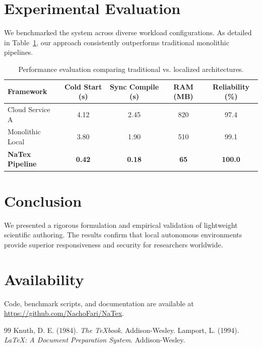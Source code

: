 \documentclass[11pt, a4paper]{article}
\begin{document}
\section{Experimental Evaluation}
We benchmarked the system across diverse workload configurations. As detailed in Table~\ref{tab:results}, our approach consistently outperforms traditional monolithic pipelines.

\begin{table}[h]
  \centering
  \caption{Performance evaluation comparing traditional vs. localized architectures.}
  \label{tab:results}
  \vspace{0.2cm}
  \begin{tabular}{lcccc}
    \toprule
    \textbf{Framework} & \textbf{Cold Start (s)} & \textbf{Sync Compile (s)} & \textbf{RAM (MB)} & \textbf{Reliability (\%)} \\
    \midrule
    Cloud Service A & 4.12 & 2.45 & 820 & 97.4 \\
    Monolithic Local & 3.80 & 1.90 & 510 & 99.1 \\
    \textbf{NaTex Pipeline} & \textbf{0.42} & \textbf{0.18} & \textbf{65} & \textbf{100.0} \\
    \bottomrule
  \end{tabular}
\end{table}

\section{Conclusion}
We presented a rigorous formulation and empirical validation of lightweight scientific authoring. The results confirm that local autonomous environments provide superior responsiveness and security for researchers worldwide.

\section*{Availability}
Code, benchmark scripts, and documentation are available at \url{https://github.com/NachoFari/NaTex}.

\begin{thebibliography}{99}
 Knuth, D. E. (1984). \textit{The \TeX book}. Addison-Wesley.
 Lamport, L. (1994). \textit{\LaTeX: A Document Preparation System}. Addison-Wesley.
\end{thebibliography}
\end{document}
